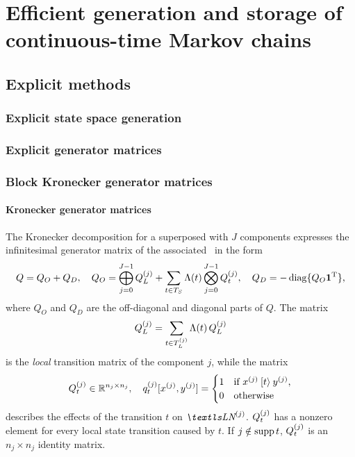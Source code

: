 \chapter{Efficient generation and storage of continuous-time Markov chains}
\label{chap:genstor}

\section{Explicit methods}

\subsection{Explicit state space generation}

\subsection{Explicit generator matrices}

\subsection{Block Kronecker generator matrices}

\subsubsection{Kronecker generator matrices}

The Kronecker decomposition for a superposed  with $J$
components expresses the infinitesimal generator matrix of the
associated \CTMC\ in the form
\begin{equation}
  \label{eq:genstor:explicit:kronecker}
  Q = Q_O + Q_D, \quad Q_O = \bigoplus_{j = 0}^{J - 1} Q_L^{(j)}
  + \sum_{t \in T_S} \Lambda(t) \bigotimes_{j = 0}^{J - 1}
  Q_{t}^{(j)}, \quad Q_D = -\operatorname{diag} \{ Q_O \bm{\mathrm{1}}^{\mathrm{T}} \} \text,
\end{equation}
where $Q_O$ and $Q_D$ are the off-diagonal and diagonal parts of
$Q$. The matrix
\begin{equation}
  Q_L^{(j)} = \sum_{t \in T_L^{(j)}} \Lambda(t) \, Q_L^{(j)}
\end{equation}
is the \emph{local} transition matrix of the component $j$, while
the matrix
\begin{equation}
  Q_t^{(j)} \in \mathbb{R}^{n_j \times n_j}, \quad
  q_t^{(j)}[x^{(j)},y^{(j)}] = \begin{cases}
    1 & \text{if $x^{(j)} \mathbin{[t\rangle} y^{(j)}$,} \\
    0 & \text{otherwise}
  \end{cases}
\end{equation}
describes the effects of the transition $t$ on
$\LN{j}$. $Q_t^{(j)}$ has a nonzero element for every local state
transition caused by $t$. If $j \notin \operatorname{supp} t$, $Q_t^{(j)}$ is
an $n_j \times n_j$ identity matrix.

